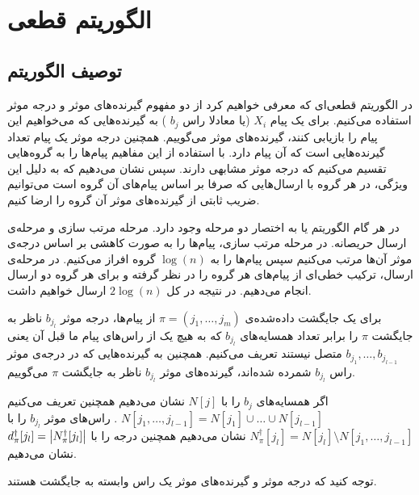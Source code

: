 \section{
	الگوریتم قطعی
	}
	\subsection{
	توصیف الگوریتم
	}

در الگوریتم قطعی‌ای که معرفی خواهیم کرد از دو مفهوم گیرنده‌های موثر و درجه موثر استفاده می‌کنیم. برای یک پیام
$X_i$
(یا معادلا راس
$b_j$
)
به گیرنده‌هایی که می‌خواهیم این پیام را بازیابی کنند، گیرنده‌های موثر می‌گوییم. همچنین درجه موثر یک پیام تعداد گیرنده‌هایی است که آن پیام دارد. با استفاده از این مفاهیم پیام‌ها را به گروه‌هایی تقسیم می‌کنیم که درجه موثر مشابهی دارند. سپس نشان می‌دهیم که به دلیل این ویژگی، در هر گروه با ارسال‌هایی که صرفا بر اساس پیام‌های آن گروه است می‌توانیم ضریب ثابتی از گیرنده‌های موثر آن گروه را ارضا کنیم.

در هر گام الگوریتم
یا به اختصار
دو مرحله وجود دارد. مرحله مرتب سازی و مرحله‌ی ارسال حریصانه. در مرحله مرتب سازی، پیام‌ها را به صورت کاهشی بر اساس درجه‌ی موثر آن‌ها مرتب می‌کنیم سپس پیام‌ها را به 
$\log(n)$
گروه افراز می‌کنیم. در مرحله‌ی ارسال، ترکیب خطی‌ای از پیام‌های هر گروه را در نظر گرفته و برای هر گروه دو ارسال انجام می‌دهیم. در نتیجه در کل
$2 \log(n)$
ارسال خواهیم داشت.

\begin{definition}
	برای یک جایگشت داده‌شده‌ی 
	$\pi = (j_1, \ldots, j_m)$
	از پیام‌ها، درجه موثر
	$b_{j_l}$
	ناظر به جایگشت 
	$\pi$
	را برابر تعداد همسایه‌های 
	$b_{j_l}$
	که به هیچ یک از راس‌‌های پیام ما قبل آن یعنی
	$b_{j_1}, \ldots, b_{j_{l - 1}}$
	متصل نیستند تعریف می‌کنیم. همچنین به گیرنده‌هایی که در درجه‌ی موثر راس
		$b_{j_l}$
		شمرده شده‌اند، گیرنده‌های موثر
		$b_{j_l}$
		 ناظر به جایگشت
		$\pi$
		 می‌گوییم.
		\end{definition}
		\begin{notation}
		 اگر همسایه‌های
		 $b_j$
		 را با
		 $N[j]$
		 نشان می‌دهیم همچنین تعریف می‌کنیم
		 $N[j_1, \ldots, j_{l - 1}] = N[j_1] \cup \ldots \cup N[j_{l - 1}]$
		 . راس‌های موثر
 		$b_{j_l}$
 		را با
 		$N^\dagger_\pi [j_l] = N[j_l] \setminus N[j_1, \ldots, j_{l - 1}]$
 		نشان می‌دهیم همچنین درجه را با
 		$d^\dagger_\pi[j_l] = \left|{N^\dagger_\pi [j_l] }\right|$
 		نشان می‌دهیم.
 	\end{notation}


توجه کنید که درجه موثر و گیرنده‌های موثر یک راس وابسته به جایگشت هستند.

